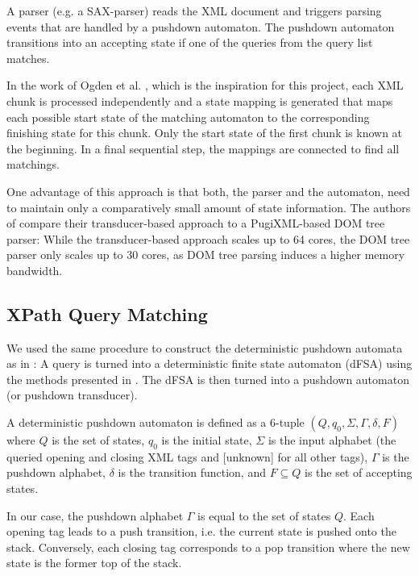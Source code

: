 A parser (e.g. a SAX-parser) reads the XML document and triggers parsing events
that are handled by a pushdown automaton. The pushdown automaton transitions
into an accepting state if one of the queries from the query list matches.

In the work of Ogden et al. \cite{Ogden2013}, which is the inspiration for this
project, each XML chunk is processed independently and a state mapping is
generated that maps each possible start state of the matching automaton to the
corresponding finishing state for this chunk. Only the start state of the first
chunk is known at the beginning. In a final sequential step, the mappings are
connected to find all matchings.

One advantage of this approach is that both, the parser and the automaton, need
to maintain only a comparatively small amount of state information. The authors of 
\cite{Ogden2013} compare their transducer-based approach to a PugiXML-based 
DOM tree parser:
While the transducer-based approach scales up to 64 cores, the DOM tree parser
only scales up to 30 cores, as DOM tree parsing induces a higher memory
bandwidth. 

\subsection{XPath Query Matching}
We used the same procedure to construct the deterministic pushdown automata as
in \cite{Ogden2013}: A query is turned into a deterministic finite state
automaton (dFSA) using the methods presented in \cite{Green2004}. The dFSA is
then turned into a pushdown automaton (or pushdown transducer).

A deterministic pushdown automaton is defined as a 6-tuple $(Q, q_0, \Sigma,
\Gamma, \delta, F)$ where $Q$ is the set of states, $q_0$ is the initial state,
$\Sigma$ is the input alphabet (the queried opening and closing XML tags and  
[unknown] for all other tags), $\Gamma$ is the pushdown alphabet, $\delta$ 
is the transition function, and $F \subseteq Q$ is the set of accepting states.

In our case, the pushdown alphabet $\Gamma$ is equal to the set of states $Q$.
Each opening tag leads to a push transition, i.e. the current state is pushed
onto the stack. Conversely, each closing tag corresponds to a pop transition
where the new state is the former top of the stack.


